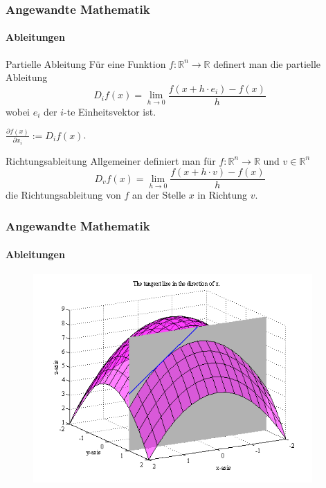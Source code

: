 \documentclass{beamer}
\begin{document}
    \begin{frame}
        \frametitle{Angewandte Mathematik}
        \framesubtitle{Ableitungen}  
        \begin{block}{Partielle Ableitung}
            Für eine Funktion $f: \mathbb{R}^n \to \mathbb{R}$ definert man die partielle Ableitung 
            \[
                D_i f (x) = \lim_{h \to 0} \frac{f(x + h \cdot e_i) - f(x)}{h}
                \]
            wobei \( e_i \) der \( i \)-te Einheitsvektor ist. 
           
            \( \frac{\partial f(x)}{\partial x_i} :=  D_i f (x)\).
            
        \end{block}

        \begin{block}{Richtungsableitung}
            Allgemeiner definiert man für $f: \mathbb{R}^n \to \mathbb{R}$ und  $v \in \mathbb{R}^n$
            \[
                D_v f (x) = \lim_{h \to 0} \frac{f(x + h \cdot v) - f(x)}{h}
                \]
            die Richtungsableitung von $f$ an der Stelle $x$ in Richtung $v$.            
        \end{block}
    \end{frame}

    \begin{frame}
        \frametitle{Angewandte Mathematik}
        \framesubtitle{Ableitungen}  
    
    \begin{figure}[H]
          \centering
        \includegraphics[width=0.95\textwidth]{images/diffable}
    \end{figure}
    
     \end{frame}
\end{document}
